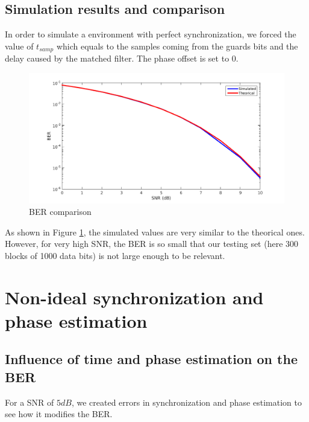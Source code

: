 \documentclass[a4paper,12pt]{article}
\begin{document}
\subsection{Simulation results and comparison}
In order to simulate a environment with perfect synchronization, we forced the value of $t_{samp}$ which equals to the samples coming from the guards bits and the delay caused by the matched filter. The phase offset is set to $0$.
\begin{figure}[ht]
\centering
\begin{center}
\includegraphics[scale=0.30]{BER_Exact-Sim.png}
\caption{BER comparison}
\label{BER}
\end{center}
\end{figure}
As shown in Figure \ref{BER}, the simulated values are very similar to the theorical ones. However, for very high SNR, the BER is so small that our testing set (here 300 blocks of 1000 data bits) is not large enough to be relevant.

\newpage
\section{Non-ideal synchronization and phase estimation}
\subsection{Influence of time and phase estimation on the BER}
For a SNR of $5dB$, we created errors in synchronization and phase estimation to see how it modifies the BER.
\end{document}
